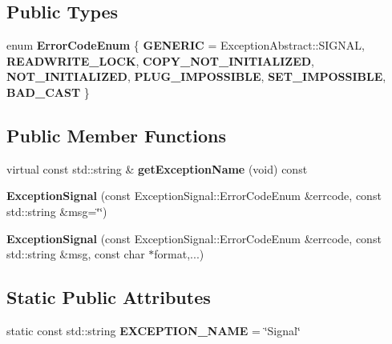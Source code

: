 \subsection*{Public Types}
\begin{DoxyCompactItemize}
\item 
\mbox{\label{classdynamic__graph_1_1ExceptionSignal_a122fbe147d0fd92c511f5839394e2bc1}} 
enum {\bfseries Error\+Code\+Enum} \{ \newline
{\bfseries G\+E\+N\+E\+R\+IC} = Exception\+Abstract\+:\+:S\+I\+G\+N\+AL, 
{\bfseries R\+E\+A\+D\+W\+R\+I\+T\+E\+\_\+\+L\+O\+CK}, 
{\bfseries C\+O\+P\+Y\+\_\+\+N\+O\+T\+\_\+\+I\+N\+I\+T\+I\+A\+L\+I\+Z\+ED}, 
{\bfseries N\+O\+T\+\_\+\+I\+N\+I\+T\+I\+A\+L\+I\+Z\+ED}, 
\newline
{\bfseries P\+L\+U\+G\+\_\+\+I\+M\+P\+O\+S\+S\+I\+B\+LE}, 
{\bfseries S\+E\+T\+\_\+\+I\+M\+P\+O\+S\+S\+I\+B\+LE}, 
{\bfseries B\+A\+D\+\_\+\+C\+A\+ST}
 \}
\end{DoxyCompactItemize}
\subsection*{Public Member Functions}
\begin{DoxyCompactItemize}
\item 
\mbox{\label{classdynamic__graph_1_1ExceptionSignal_a5f6f567db80992cf39b8ce5cff437cb7}} 
virtual const std\+::string \& {\bfseries get\+Exception\+Name} (void) const
\item 
\mbox{\label{classdynamic__graph_1_1ExceptionSignal_aad0d2b0f022ca8bfc8ce3a9e81475d52}} 
{\bfseries Exception\+Signal} (const Exception\+Signal\+::\+Error\+Code\+Enum \&errcode, const std\+::string \&msg=\char`\"{}\char`\"{})
\item 
\mbox{\label{classdynamic__graph_1_1ExceptionSignal_a8b317aa83e16632ce3ce6e6c833acb91}} 
{\bfseries Exception\+Signal} (const Exception\+Signal\+::\+Error\+Code\+Enum \&errcode, const std\+::string \&msg, const char $\ast$format,...)
\end{DoxyCompactItemize}
\subsection*{Static Public Attributes}
\begin{DoxyCompactItemize}
\item 
\mbox{\label{classdynamic__graph_1_1ExceptionSignal_a3f08eaf0b6f59dffaa47e844387e978b}} 
static const std\+::string {\bfseries E\+X\+C\+E\+P\+T\+I\+O\+N\+\_\+\+N\+A\+ME} = \char`\"{}Signal\char`\"{}
\end{DoxyCompactItemize}
